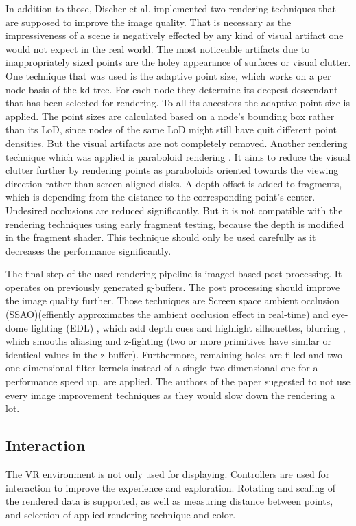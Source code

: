 \documentclass[10pt,twocolumn,letterpaper]{article}
\begin{document}
\setlength{\parindent}{1pc}In addition to those, Discher et al. \cite{discher_point-based_2018} implemented two rendering techniques that are supposed to improve the image quality. That is necessary as the impressiveness of a scene is negatively effected by any kind of visual artifact one would not expect in the real world. The most noticeable artifacts due to inappropriately sized points are the holey appearance of surfaces or visual clutter. One technique that was used is the adaptive point size, which works on a per node basis of the kd-tree. For each node they determine its deepest descendant that has been selected for rendering. To all its ancestors the adaptive point size is applied. The point sizes are calculated based on a node’s bounding box rather than its LoD, since nodes of the same LoD might still have quit different point densities. But the visual artifacts are not completely removed. Another rendering technique which was applied is paraboloid rendering \cite{schutz2016potree}. It aims to reduce the visual clutter further by rendering points as paraboloids oriented towards the viewing direction rather than screen aligned disks. A depth offset is added to fragments, which is depending from the distance to the corresponding point's center. Undesired occlusions are reduced significantly. But it is not compatible with the rendering techniques using early fragment testing, because the depth is modified in the fragment shader. This technique should only be used carefully as it decreases the performance significantly.

\setlength{\parindent}{1pc}The final step of the used rendering pipeline is imaged-based post processing. It operates on previously generated g-buffers. The post processing should improve the image quality further. Those techniques are Screen space ambient occlusion (SSAO)(effiently approximates the ambient occlusion effect in real-time) \cite{mittring2007finding} and eye-dome lighting (EDL) \cite{boucheny2009interactive}, which add depth cues and highlight silhouettes, blurring \cite{lukin2016tips}, which smooths aliasing and z-fighting (two or more primitives have similar or identical values in the z-buffer). Furthermore, remaining holes are filled and two one-dimensional filter kernels \cite{dobrev2010image} instead of a single two dimensional one for a performance speed up, are applied. The authors of the paper suggested to not use every image improvement techniques as they would slow down the rendering a lot.

\subsection{Interaction}
The VR environment is not only used for displaying. Controllers are used for interaction to improve the experience and exploration. Rotating and scaling of the rendered data is supported, as well as measuring distance between points, and selection of applied rendering technique and color.
\end{document}
